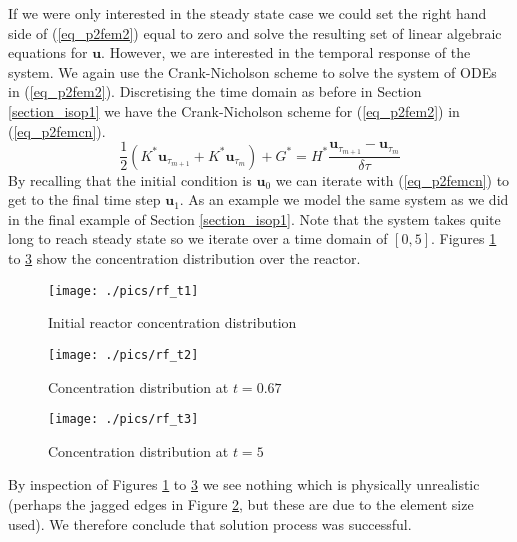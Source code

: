 \documentclass[11pt,fleqn]{article}
\theoremstyle{defstyle}
\begin{document}
If we were only interested in the steady state case we could set the right hand side of (\ref{eq_p2fem2}) equal to zero and solve the resulting set of linear algebraic equations for $\mathbf{u}$. However, we are interested in the temporal response of the system. We again use the Crank-Nicholson scheme to solve the system of ODEs in (\ref{eq_p2fem2}). Discretising the time domain as before in Section \ref{section_isop1} we have the Crank-Nicholson scheme for (\ref{eq_p2fem2}) in (\ref{eq_p2femcn}).
\begin{equation}
\frac{1}{2}\left(K^*\mathbf{u}_{\tau_{m+1}} +K^*\mathbf{u}_{\tau_{m}}\right) + G^* = H^*\frac{\mathbf{u}_{\tau_{m+1}}-\mathbf{u}_{\tau_{m}}}{\delta \tau}
\label{eq_p2femcn}
\end{equation}
By recalling that the initial condition is $\mathbf{u}_0$ we can iterate with (\ref{eq_p2femcn}) to get to the final time step $\mathbf{u}_1$. As an example we model the same system as we did in the final example of Section \ref{section_isop1}. Note that the system takes quite long to reach steady state so we iterate over a time domain of $[0,5]$. Figures \ref{fig_rft1} to \ref{fig_rft3} show the concentration distribution over the reactor.
\begin{figure}[H] 
\centering
\texttt{[image: ./pics/rf\_t1]}
\caption{Initial reactor concentration distribution} 
\label{fig_rft1}
\end{figure}
\begin{figure}[H] 
\centering
\texttt{[image: ./pics/rf\_t2]}
\caption{Concentration distribution at $t=0.67$} 
\label{fig_rft2}
\end{figure}
\begin{figure}[H] 
\centering
\texttt{[image: ./pics/rf\_t3]}
\caption{Concentration distribution at $t=5$} 
\label{fig_rft3}
\end{figure}
By inspection of Figures \ref{fig_rft1} to \ref{fig_rft3} we see nothing which is physically unrealistic (perhaps the jagged edges in Figure \ref{fig_rft2}, but these are due to the element size used). We therefore conclude that solution process was successful.
\end{document}
